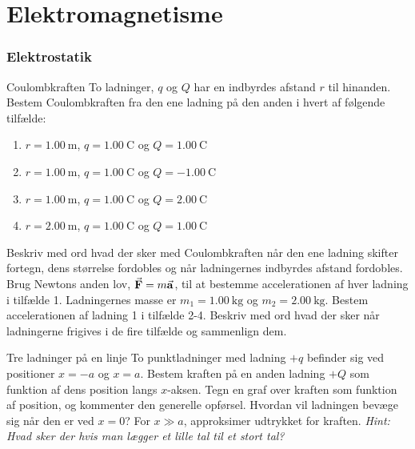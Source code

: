 \documentclass[crop=false, class=memoir]{standalone}
\begin{document}
\chapter{Elektromagnetisme} \label{chap:elektro_opg}
\subsection*{Elektrostatik}
\begin{opgave}[1]{Coulombkraften}
    To ladninger, $q$ og $Q$ har en indbyrdes afstand $r$ til hinanden.
    \opg Bestem Coulombkraften fra den ene ladning på den anden i hvert af følgende tilfælde:
    \begin{enumerate}
        \item $r = \SI{1,00}{\metre}$, $q = \SI{1,00}{\coulomb}$ og $Q = \SI{1,00}{\coulomb}$
        \item $r = \SI{1,00}{\metre}$, $q = \SI{1,00}{\coulomb}$ og $Q = \SI{-1,00}{\coulomb}$
        \item $r = \SI{1,00}{\metre}$, $q = \SI{1,00}{\coulomb}$ og $Q = \SI{2,00}{\coulomb}$
        \item $r = \SI{2,00}{\metre}$, $q = \SI{1,00}{\coulomb}$ og $Q = \SI{1,00}{\coulomb}$
    \end{enumerate}
    \opg Beskriv med ord hvad der sker med Coulombkraften når den ene ladning skifter fortegn, dens størrelse fordobles og når ladningernes indbyrdes afstand fordobles.
    \opg Brug Newtons anden lov, $\va{F}=m\va{a}$, til at bestemme accelerationen af hver ladning i tilfælde 1. Ladningernes masse er $m_1 = \SI{1,00}{\kilo\gram}$ og $m_2 = \SI{2,00}{\kilo\gram}$.
    \opg Bestem accelerationen af ladning 1 i tilfælde 2-4.
    \opg Beskriv med ord hvad der sker når ladningerne frigives i de fire tilfælde og sammenlign dem.
\end{opgave}

\begin{opgave}[2]{Tre ladninger på en linje}
    To punktladninger med ladning $+q$ befinder sig ved positioner $x=-a$ og $x=a$.
    \opg Bestem kraften på en anden ladning $+Q$ som funktion af dens position langs $x$-aksen.
    \opg Tegn en graf over kraften som funktion af position, og kommenter den generelle opførsel.
    \opg Hvordan vil ladningen bevæge sig når den er ved $x=0$?
    \opg For $x\gg a$, approksimer udtrykket for kraften. \textit{Hint: Hvad sker der hvis man lægger et lille tal til et stort tal?}
\end{opgave}
\end{document}
